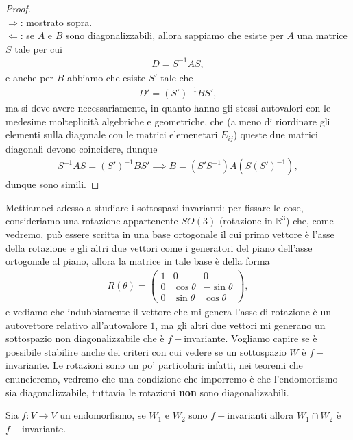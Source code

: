 \begin{remark}
\begin{theorem}
$$        $$
    \end{theorem}
    \begin{proof} \hspace{1cm} \\
        $\boxed{\Rightarrow}$: mostrato sopra. \\
        $\boxed{\Leftarrow}$: se $A$ e $B$ sono diagonalizzabili, allora sappiamo che esiste per $A$ una matrice $S$ tale per cui
        \begin{align}
            D = S^{-1} A S,
        \end{align}
        e anche per $B$ abbiamo che esiste $S'$ tale che 
        \begin{align}
            D' = (S')^{-1} B S',
        \end{align}
        ma si deve avere necessariamente, in quanto hanno gli stessi autovalori con le medesime molteplicità algebriche e geometriche, che (a meno di riordinare gli elementi sulla diagonale con le matrici elemenetari $E_{ij}$) queste due matrici diagonali devono coincidere, dunque
        \begin{align}
            S^{-1} A S = (S')^{-1} B S' \implies B = (S' S^{-1}) A (S (S')^{-1}),
        \end{align}
        dunque sono simili.
    \end{proof}
\end{remark}

Mettiamoci adesso a studiare i sottospazi invarianti: per fissare le cose, consideriamo una rotazione appartenente $SO(3)$ (rotazione in $\mathbb{R}^3$) che, come vedremo, può essere scritta in una base ortogonale il cui primo vettore è l'asse della rotazione e gli altri due vettori come i generatori del piano dell'asse ortogonale al piano, allora la matrice in tale base è della forma
\begin{align}
    R(\theta) = \begin{pmatrix}
        1 & 0 & 0 \\
        0 & \cos{\theta} & -\sin{\theta} \\
        0 & \sin{\theta} & \cos{\theta}
    \end{pmatrix},
\end{align}
e vediamo che indubbiamente il vettore che mi genera l'asse di rotazione è un autovettore relativo all'autovalore $1$, ma gli altri due vettori mi generano un sottospazio non diagonalizzabile che è $f-$invariante. Vogliamo capire se è possibile stabilire anche dei criteri con cui vedere se un sottospazio $W$ è $f-$invariante. Le rotazioni sono un po' particolari: infatti, nei teoremi che enuncieremo, vedremo che 
una condizione che imporremo è che l'endomorfismo sia diagonalizzabile, tuttavia le rotazioni \textbf{non} sono diagonalizzabili. 
\begin{exercise}
    Sia $f: V \to V$ un endomorfismo, se $W_1$ e $W_2$ sono $f-$invarianti allora $W_1 \cap W_2$ è $f-$invariante.
\end{exercise}

